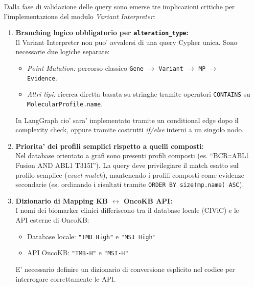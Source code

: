 \documentclass[12pt, a4paper]{article}
\begin{document}
\begin{insightbox}
Dalla fase di validazione delle query sono emerse tre implicazioni critiche per l'implementazione del modulo \textit{Variant Interpreter}:
\begin{enumerate}[leftmargin=1.6em, itemsep=6pt]
  \item \textbf{Branching logico obbligatorio per \texttt{alteration\_type}:}\\
        Il Variant Interpreter non puo' avvalersi di una query Cypher unica. Sono necessarie due logiche separate:
        \begin{itemize}[itemsep=2pt, leftmargin=1.2em]
          \item \textit{Point Mutation:} percorso classico \texttt{Gene} $\to$ \texttt{Variant} $\to$ \texttt{MP} $\to$ \texttt{Evidence}.
          \item \textit{Altri tipi:} ricerca diretta basata su stringhe tramite operatori \texttt{CONTAINS} su \texttt{MolecularProfile.name}.
        \end{itemize}
        In LangGraph cio' sara' implementato tramite un conditional edge dopo il complexity check, oppure tramite costrutti \textit{if/else} interni a un singolo nodo.
  \item \textbf{Priorita' dei profili semplici rispetto a quelli composti:}\\
        Nel database orientato a grafi sono presenti profili composti (es. ``BCR::ABL1 Fusion AND ABL1 T315I''). La query deve privilegiare il match esatto sul profilo semplice (\textit{exact match}), mantenendo i profili composti come evidenze secondarie (es. ordinando i risultati tramite \texttt{ORDER BY size(mp.name) ASC}).
  \item \textbf{Dizionario di Mapping KB $\leftrightarrow$ OncoKB API:}\\
        I nomi dei biomarker clinici differiscono tra il database locale (CIViC) e le API esterne di OncoKB:
        \begin{itemize}[itemsep=1pt, leftmargin=1.2em]
          \item Database locale: \texttt{"TMB High"} e \texttt{"MSI High"}
          \item API OncoKB: \texttt{"TMB-H"} e \texttt{"MSI-H"}
        \end{itemize}
        E' necessario definire un dizionario di conversione esplicito nel codice per interrogare correttamente le API.
\end{enumerate}
\end{insightbox}
\end{document}
